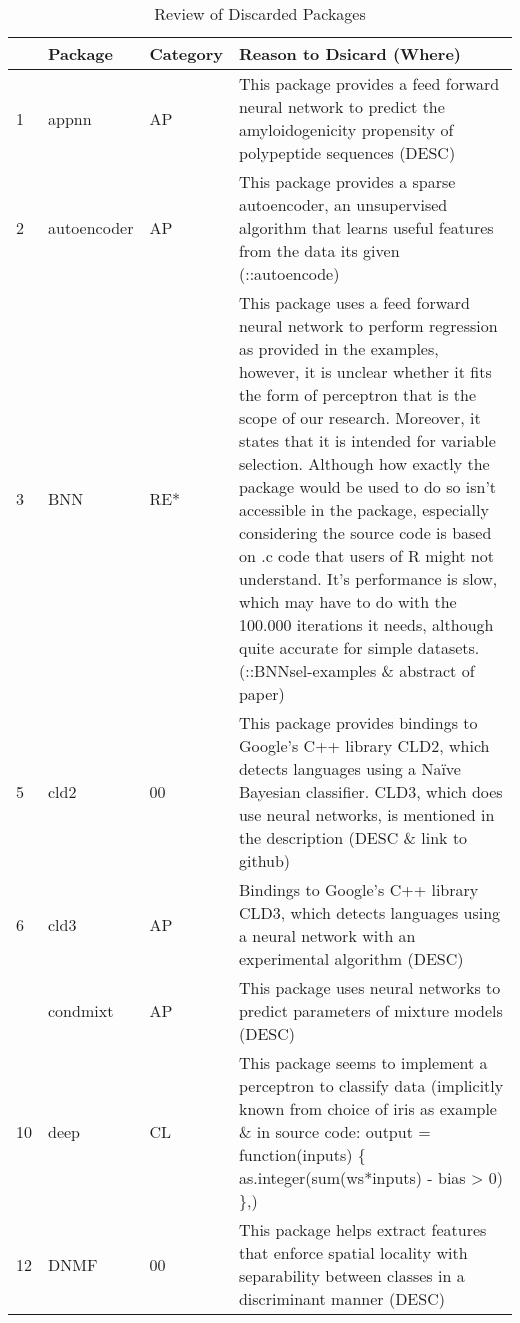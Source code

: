 \begin{Schunk}
\begingroup\fontsize{7}{9}\selectfont

\begin{longtable}[t]{lll>{\raggedright\arraybackslash}p{10cm}}
\caption{\label{tab:unnamed-chunk-3}Review of Discarded Packages}\\
\toprule
  & Package & Category & Reason to Dsicard (Where)\\
\midrule
1 & appnn & AP & This package provides a feed forward neural network to predict the amyloidogenicity propensity of polypeptide sequences (DESC)\\
2 & autoencoder & AP & This package provides a sparse autoencoder, an unsupervised algorithm that learns useful features from the data its given (::autoencode)\\
3 & BNN & RE* & This package uses a feed forward neural network to perform regression as provided in the examples, however, it is unclear whether it fits the form of perceptron that is the scope of our research. Moreover, it states that it is intended for variable selection. Although how exactly the package would be used to do so isn't accessible in the package, especially considering the source code is based on .c code that users of R might not understand. It's performance is slow, which may have to do with the 100.000 iterations it needs, although quite accurate for simple datasets. (::BNNsel-examples \& abstract of paper)\\
5 & cld2 & 00 & This package provides bindings to Google's C++ library CLD2, which detects languages using a Naïve Bayesian classifier. CLD3, which does use neural networks, is mentioned in the description (DESC \& link to github)\\
6 & cld3 & AP & Bindings to Google's C++ library CLD3, which detects languages using a neural network with an experimental algorithm (DESC)\\
\addlinespace
7 & condmixt & AP & This package uses neural networks to predict parameters of mixture models (DESC)\\
10 & deep & CL & This package seems to implement a perceptron to classify data (implicitly known from choice of iris as example \& in source code: output = function(inputs) \{
            as.integer(sum(ws*inputs) - bias > 0)
        \},)\\
12 & DNMF & 00 & This package helps extract features that enforce spatial locality with separability between classes in a discriminant manner (DESC)\\

\end{longtable}
\end{Schunk}
